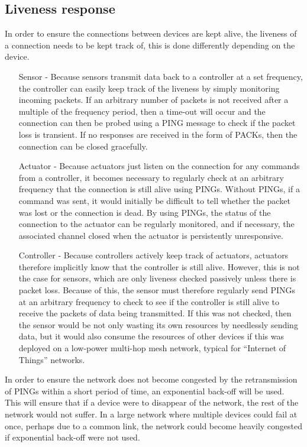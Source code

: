 \subsection{Liveness response} %
\label{sub:liveness_response}
In order to ensure the connections between devices are kept alive, the liveness of a connection needs to be kept track of, this is done differently depending on the device.
\begin{itemize}
	\item [Sensor -] Because sensors transmit data back to a controller at a set frequency, the controller can easily keep track of the liveness by simply monitoring incoming packets. If an arbitrary number of packets is not received after a multiple of the frequency period, then a time-out will occur and the connection can then be probed using a PING message to check if the packet loss is transient. If no responses are received in the form of PACKs, then the connection can be closed gracefully. 
	\item [Actuator -] Because actuators just listen on the connection for any commands from a controller, it becomes necessary to regularly check at an arbitrary frequency that the connection is still alive using PINGs. Without PINGs, if a command was sent, it would initially be difficult to tell whether the packet was lost or the connection is dead. By using PINGs, the status of the connection to the actuator can be regularly monitored, and if necessary, the associated channel closed when the actuator is persistently unresponsive.
	\item [Controller -] Because controllers actively keep track of actuators, actuators therefore implicitly know that the controller is still alive. However, this is not the case for sensors, which are only liveness checked passively unless there is packet loss. Because of this, the sensor must therefore regularly send PINGs at an arbitrary frequency to check to see if the controller is still alive to receive the packets of data being transmitted. If this was not checked, then the sensor would be not only wasting its own resources by needlessly sending data, but it would also consume the resources of other devices if this was deployed on a low-power multi-hop mesh network, typical for ``Internet of Things'' networks.
\end{itemize}

In order to ensure the network does not become congested by the retransmission of PINGs within a short period of time, an exponential back-off will be used. This will ensure that if a device were to disappear of the network, the rest of the network would not suffer. In a large network where multiple devices could fail at once, perhaps due to a common link, the network could become heavily congested if exponential back-off were not used.

